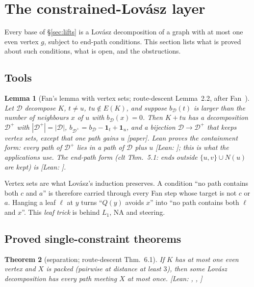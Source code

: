 \documentclass[11pt]{amsart}
\newtheorem{theorem}{Theorem}[section]
\newtheorem{lemma}[theorem]{Lemma}
\theoremstyle{definition}
\newcommand{\st}[1]{\textsf{\small[#1]}}
\newcommand{\cD}{\mathcal D}
\begin{document}
\section{The constrained-Lov\'asz layer}\label{sec:clt}

Every base of \S\ref{sec:lifts} is a Lov\'asz decomposition of a graph with at most one even vertex
$g$, subject to end-path conditions. This section lists what is proved about such conditions, what is
open, and the obstructions.

\subsection{Tools}
\begin{lemma}[Fan's lemma with vertex sets; route-descent Lemma~2.2, after Fan~\cite{Fan05}]\label{lem:fan}
Let $\cD$ decompose $K$, $t\ne u$, $tu\notin E(K)$, and suppose $b_\cD(t)$ is larger than the number of
neighbours $x$ of $u$ with $b_\cD(x)=0$. Then $K+tu$ has a decomposition $\cD^+$ with $|\cD^+|=|\cD|$,
$b_{\cD^+}=b_\cD-\mathbf 1_t+\mathbf 1_u$, and a bijection $\cD\to\cD^+$ that keeps vertex sets, except
that one path gains $u$ \st{paper}. Lean proves the containment form: every path of $\cD^+$ lies in a
path of $\cD$ plus $u$ \st{Lean: }; this is what the applications use. The end-path form (clt Thm.~5.1: ends outside
$\{u,v\}\cup N(u)$ are kept) is \st{Lean: }.
\end{lemma}

Vertex sets are what Lov\'asz's induction preserves. A condition ``no path contains both $c$ and $a$'' is
therefore carried through every Fan step whose target is not $c$ or $a$. Hanging a leaf $\ell$ at $y$
turns ``$Q(y)$ avoids $x$'' into ``no path contains both $\ell$ and $x$''. This \emph{leaf trick} is
behind $L_1$, NA and steering.

\subsection{Proved single-constraint theorems}

\begin{theorem}[separation; route-descent Thm.~6.1]\label{thm:sep}
If $K$ has at most one even vertex and $X$ is \emph{packed} (pairwise at distance at least $3$), then some
Lov\'asz decomposition has every path meeting $X$ at most once. \st{Lean: ,
, \lean{lovasz_avoid}}
\end{theorem}
\end{document}
